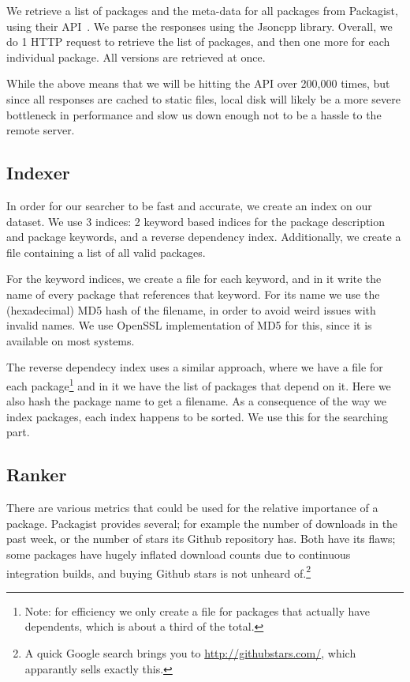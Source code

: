 \documentclass{article}
\begin{document}
We retrieve a list of packages and the meta-data for all packages from Packagist, using their API~\cite{packagist-api}. We parse the responses using the Jsoncpp library. Overall, we do 1 HTTP request to retrieve the list of packages, and then one more for each individual package. All versions are retrieved at once.

While the above means that we will be hitting the API over 200,000 times, but since all responses are cached to static files, local disk will likely be a more severe bottleneck in performance and slow us down enough not to be a hassle to the remote server.

\subsection{Indexer}
\label{sec:indexer}

In order for our searcher to be fast and accurate, we create an index on our dataset. We use 3 indices: 2 keyword based indices for the package description and package keywords, and a reverse dependency index. Additionally, we create a file containing a list of all valid packages.

For the keyword indices, we create a file for each keyword, and in it write the name of every package that references that keyword. For its name we use the (hexadecimal) MD5 hash of the filename, in order to avoid weird issues with invalid names. We use OpenSSL implementation of MD5 for this, since it is available on most systems.

The reverse dependecy index uses a similar approach, where we have a file for each package\footnote{Note: for efficiency we only create a file for packages that actually have dependents, which is about a third of the total.} and in it we have the list of packages that depend on it. Here we also hash the package name to get a filename. As a consequence of the way we index packages, each index happens to be sorted. We use this for the searching part.


\subsection{Ranker}

There are various metrics that could be used for the relative importance of a package. Packagist provides several; for example the number of downloads in the past week, or the number of stars its Github repository has. Both have its flaws; some packages have hugely inflated download counts due to continuous integration builds, and buying Github stars is not unheard of.\footnote{A quick Google search brings you to \url{http://githubstars.com/}, which apparantly sells exactly this.}
\end{document}
